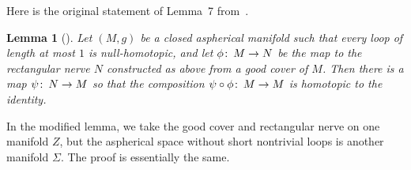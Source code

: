 \documentclass[12pt]{amsart}
\makeatletter
\newtheorem*{rep@theorem}{{Lemma} \ref##}
\newtheorem{lem}[dfn]{Lemma}
	{\newenvironment{rep{lem}}[1]{ } \begin{rep@theorem}} \end{rep@theorem}}
\numberwithin{equation}{section}
\makeatother
\begin{document}
Here is the original statement of Lemma~7 from~\cite{Guth11}.

\begin{lem}[{\cite[Lemma~7]{Guth11}}]\label{lem:original7}
Let $(M, g)$ be a closed aspherical manifold such that every loop of length at most $1$ is null-homotopic, and let $\phi {\colon\thinspace} M \rightarrow N$ be the map to the rectangular nerve $N$ constructed as above from a good cover of $M$.  Then there is a map $\psi {\colon\thinspace} N \rightarrow M$ so that the composition $\psi \circ \phi {\colon\thinspace} M \rightarrow M$ is homotopic to the identity.
\end{lem}

In the modified lemma, we take the good cover and rectangular nerve on one manifold $Z$, but the aspherical space without short nontrivial loops is another manifold $\Sigma$.  The proof is essentially the same.
\end{document}
